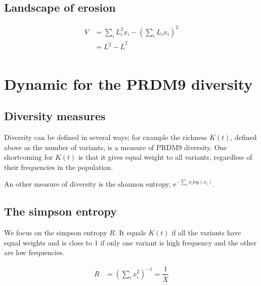 \documentclass{article}
\begin{document}
\subsection{Landscape of erosion}

\begin{equation}
  \begin{aligned}
    V &=  \sum_i L_i^2 x_i  -  \left( \sum_i L_i x_i \right)^2 \\
    &=
    \overline{L^2} - \overline{L}^2 \\
  \end{aligned}
\end{equation}

\section{Dynamic for the PRDM9 diversity}

\subsection{Diversity measures}
Diversity can be defined in several ways; for example the richness $K(t)$, defined above as the number of variants, is a measure of PRDM9 diversity. One shortcoming for $K(t)$ is that it gives equal weight to all variants, regardless of their frequencies in the population. 

An other measure of diversity is the shannon entropy, $\mathrm{e}^{ - \sum_i x_i \mathrm{log}(x_i)}$. 

\subsection{The simpson entropy}
We focus on the simpson entropy $R$. It equals $K(t)$ if all the variants have equal weights and is close to $1$ if only one variant is high frequency and the other are low frequencies.

\begin{equation}
  \begin{aligned}
     R &= \left( \sum_i x_i^2  \right)^{-1} = \dfrac{1}{\overline{X}}
  \end{aligned}
\end{equation}
\end{document}
